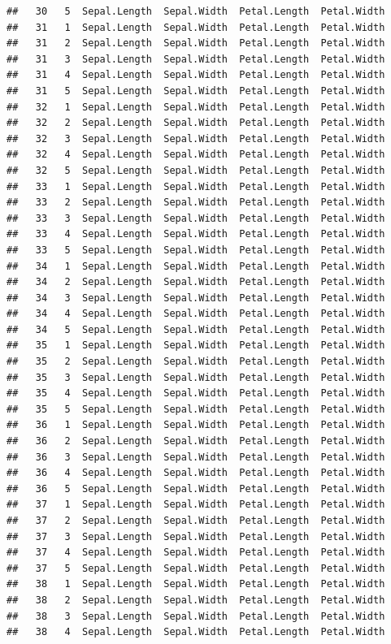 \documentclass[
]{book}
\begin{document}
\begin{verbatim}
##   30   5  Sepal.Length  Sepal.Width  Petal.Length  Petal.Width
##   31   1  Sepal.Length  Sepal.Width  Petal.Length  Petal.Width
##   31   2  Sepal.Length  Sepal.Width  Petal.Length  Petal.Width
##   31   3  Sepal.Length  Sepal.Width  Petal.Length  Petal.Width
##   31   4  Sepal.Length  Sepal.Width  Petal.Length  Petal.Width
##   31   5  Sepal.Length  Sepal.Width  Petal.Length  Petal.Width
##   32   1  Sepal.Length  Sepal.Width  Petal.Length  Petal.Width
##   32   2  Sepal.Length  Sepal.Width  Petal.Length  Petal.Width
##   32   3  Sepal.Length  Sepal.Width  Petal.Length  Petal.Width
##   32   4  Sepal.Length  Sepal.Width  Petal.Length  Petal.Width
##   32   5  Sepal.Length  Sepal.Width  Petal.Length  Petal.Width
##   33   1  Sepal.Length  Sepal.Width  Petal.Length  Petal.Width
##   33   2  Sepal.Length  Sepal.Width  Petal.Length  Petal.Width
##   33   3  Sepal.Length  Sepal.Width  Petal.Length  Petal.Width
##   33   4  Sepal.Length  Sepal.Width  Petal.Length  Petal.Width
##   33   5  Sepal.Length  Sepal.Width  Petal.Length  Petal.Width
##   34   1  Sepal.Length  Sepal.Width  Petal.Length  Petal.Width
##   34   2  Sepal.Length  Sepal.Width  Petal.Length  Petal.Width
##   34   3  Sepal.Length  Sepal.Width  Petal.Length  Petal.Width
##   34   4  Sepal.Length  Sepal.Width  Petal.Length  Petal.Width
##   34   5  Sepal.Length  Sepal.Width  Petal.Length  Petal.Width
##   35   1  Sepal.Length  Sepal.Width  Petal.Length  Petal.Width
##   35   2  Sepal.Length  Sepal.Width  Petal.Length  Petal.Width
##   35   3  Sepal.Length  Sepal.Width  Petal.Length  Petal.Width
##   35   4  Sepal.Length  Sepal.Width  Petal.Length  Petal.Width
##   35   5  Sepal.Length  Sepal.Width  Petal.Length  Petal.Width
##   36   1  Sepal.Length  Sepal.Width  Petal.Length  Petal.Width
##   36   2  Sepal.Length  Sepal.Width  Petal.Length  Petal.Width
##   36   3  Sepal.Length  Sepal.Width  Petal.Length  Petal.Width
##   36   4  Sepal.Length  Sepal.Width  Petal.Length  Petal.Width
##   36   5  Sepal.Length  Sepal.Width  Petal.Length  Petal.Width
##   37   1  Sepal.Length  Sepal.Width  Petal.Length  Petal.Width
##   37   2  Sepal.Length  Sepal.Width  Petal.Length  Petal.Width
##   37   3  Sepal.Length  Sepal.Width  Petal.Length  Petal.Width
##   37   4  Sepal.Length  Sepal.Width  Petal.Length  Petal.Width
##   37   5  Sepal.Length  Sepal.Width  Petal.Length  Petal.Width
##   38   1  Sepal.Length  Sepal.Width  Petal.Length  Petal.Width
##   38   2  Sepal.Length  Sepal.Width  Petal.Length  Petal.Width
##   38   3  Sepal.Length  Sepal.Width  Petal.Length  Petal.Width
##   38   4  Sepal.Length  Sepal.Width  Petal.Length  Petal.Width

\end{verbatim}
\end{document}
